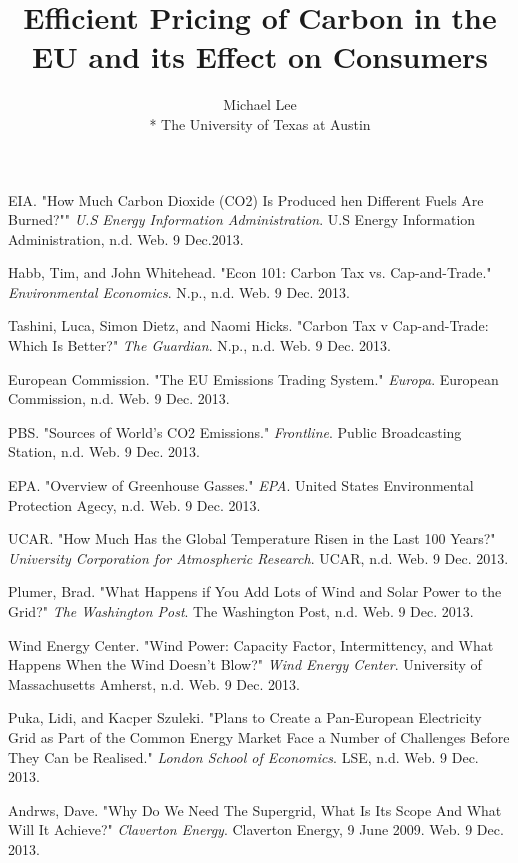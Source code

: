 \documentclass{article}
\title{Efficient Pricing of Carbon in the EU and its Effect on Consumers}
\author{Michael Lee \\*
The University of Texas at Austin}
\begin{document}
\onehalfspacing

\begin{thebibliography}{12}


 EIA. "How Much Carbon Dioxide (CO2) Is Produced hen Different Fuels Are Burned?"" \emph{U.S Energy Information Administration}. U.S Energy Information Administration, n.d. Web. 9 Dec.2013.

 Habb, Tim, and John Whitehead. "Econ 101: Carbon Tax vs. Cap-and-Trade." \emph{Environmental Economics}. N.p., n.d. Web. 9 Dec. 2013. 

 Tashini, Luca, Simon Dietz, and Naomi Hicks. "Carbon Tax v Cap-and-Trade: Which Is Better?" \emph{The Guardian}. N.p., n.d. Web. 9 Dec. 2013. 

 European Commission. "The EU Emissions Trading System." \emph{Europa}. European Commission, n.d. Web. 9 Dec. 2013. 

 PBS. "Sources of World's CO2 Emissions." \emph{Frontline}. Public Broadcasting Station, n.d. Web. 9 Dec. 2013. 

 EPA. "Overview of Greenhouse Gasses." \emph{EPA}. United States Environmental Protection Agecy, n.d. Web. 9 Dec. 2013. 

 UCAR. "How Much Has the Global Temperature Risen in the Last 100 Years?" \emph{University Corporation for Atmospheric Research}. UCAR, n.d. Web. 9 Dec. 2013. 

 Plumer, Brad. "What Happens if You Add Lots of Wind and Solar Power to the  Grid?" \emph{The Washington Post}. The Washington Post, n.d. Web. 9 Dec. 2013.

 Wind Energy Center. "Wind Power: Capacity Factor, Intermittency, and What Happens When the Wind Doesn't Blow?" \emph{Wind Energy Center}. University of Massachusetts Amherst, n.d. Web. 9 Dec. 2013.  

 Puka, Lidi, and Kacper Szuleki. "Plans to Create a Pan-European Electricity Grid as Part of the Common Energy Market Face a Number of Challenges Before They Can be Realised." \emph{London School of Economics}. LSE, n.d. Web. 9 Dec. 2013. 

 Andrws, Dave. "Why Do We Need The Supergrid, What Is Its Scope And What Will It Achieve?" \emph{Claverton Energy}. Claverton Energy, 9 June 2009. Web. 9 Dec. 2013. 




\end{thebibliography}
\end{document}
